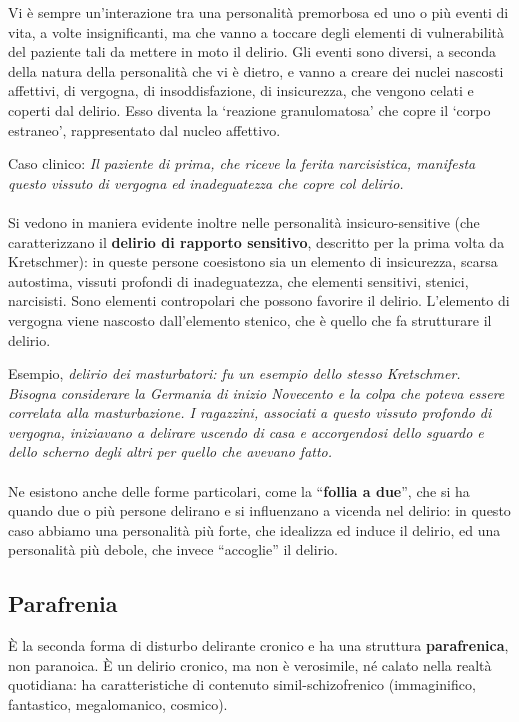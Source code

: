 Vi è sempre un'interazione tra una personalità premorbosa ed uno o più
eventi di vita, a volte insignificanti, ma che vanno a toccare degli
elementi di vulnerabilità del paziente tali da mettere in moto il
delirio. Gli eventi sono diversi, a seconda della natura della
personalità che vi è dietro, e vanno a creare dei nuclei nascosti
affettivi, di vergogna, di insoddisfazione, di insicurezza, che vengono
celati e coperti dal delirio. Esso diventa la `reazione granulomatosa'
che copre il `corpo estraneo', rappresentato dal nucleo affettivo.

Caso clinico: \emph{Il paziente di prima, che riceve la ferita
narcisistica, manifesta questo vissuto di vergogna ed inadeguatezza che
copre col delirio.}
\\\\
Si vedono in maniera evidente inoltre nelle personalità
insicuro-sensitive (che caratterizzano il \textbf{delirio di rapporto
sensitivo}, descritto per la prima volta da Kretschmer): in queste
persone coesistono sia un elemento di insicurezza, scarsa autostima,
vissuti profondi di inadeguatezza, che elementi sensitivi, stenici,
narcisisti. Sono elementi contropolari che possono favorire il delirio.
L'elemento di vergogna viene nascosto dall'elemento stenico, che è
quello che fa strutturare il delirio.

Esempio, \emph{delirio dei masturbatori: fu un esempio dello stesso
Kretschmer. Bisogna considerare la Germania di inizio Novecento e la
colpa che poteva essere correlata alla masturbazione. I ragazzini,
associati a questo vissuto profondo di vergogna, iniziavano a delirare
uscendo di casa e accorgendosi dello sguardo e dello scherno degli altri
per quello che avevano fatto.}
\\\\
Ne esistono anche delle forme particolari, come la ``\textbf{follia a
due}'', che si ha quando due o più persone delirano e si influenzano a
vicenda nel delirio: in questo caso abbiamo una personalità più forte,
che idealizza ed induce il delirio, ed una personalità più debole, che
invece ``accoglie'' il delirio.


\subsection{Parafrenia}

È la seconda forma di disturbo delirante cronico e ha una struttura
\textbf{parafrenica}, non paranoica. È un delirio cronico, ma non è
verosimile, né calato nella realtà quotidiana: ha caratteristiche di
contenuto simil-schizofrenico (immaginifico, fantastico, megalomanico,
cosmico).

